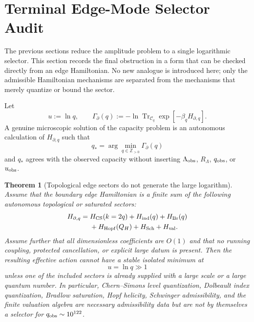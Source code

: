 \documentclass[aps,prd,reprint,nofootinbib,superscriptaddress,floatfix]{revtex4-2}
\numberwithin{equation}{section}
\theoremstyle{definition}
\theoremstyle{plain}
\newtheorem{theorem}{Theorem}[section]
\begin{document}
\section{Terminal Edge-Mode Selector Audit}\label{sec:terminal-edge-selector-audit}

The previous sections reduce the amplitude problem to a single logarithmic
selector.  This section records the final obstruction in a form that can be
checked directly from an edge Hamiltonian.  No new analogue is introduced here;
only the admissible Hamiltonian mechanisms are separated from the mechanisms
that merely quantize or bound the sector.

Let
\begin{equation}
u:=\ln q,
\qquad
\Gamma_\partial(q):=
-\ln\operatorname{Tr}_{\mathcal C_q}
\exp[-\beta_qH_{\partial,q}].
\end{equation}
A genuine microscopic solution of the capacity problem is an autonomous
calculation of \(H_{\partial,q}\) such that
\begin{equation}
q_*=\arg\min_{q\in\mathbb Z_{>0}}\Gamma_\partial(q)
\end{equation}
and \(q_*\) agrees with the observed capacity without inserting
\(\Lambda_{\rm obs}\), \(R_\Lambda\), \(q_{\rm obs}\), or \(u_{\rm obs}\).

\begin{theorem}[Topological edge sectors do not generate the large logarithm]\label{thm:topological-edge-no-large-u}
Assume that the boundary edge Hamiltonian is a finite sum of the following
autonomous topological or saturated sectors:
\begin{align}
H_{\partial,q}
={}&H_{\rm CS}(k=2q)+H_{\rm ind}(q)+H_{\rm Br}(q)\nonumber\\
&+H_{\rm Hopf}(Q_H)+H_{\rm Sch}+H_{\rm val}.
\end{align}
Assume further that all dimensionless coefficients are \(O(1)\) and that no
running coupling, protected cancellation, or explicit large datum is present.
Then the resulting effective action cannot have a stable isolated minimum at
\[
u=\ln q\gg1
\]
unless one of the included sectors is already supplied with a large scale or a
large quantum number.  In particular, Chern--Simons level quantization,
Dolbeault index quantization, Bradlow saturation, Hopf helicity, Schwinger
admissibility, and the finite valuation algebra are necessary admissibility
data but are not by themselves a selector for \(q_{\rm obs}\sim10^{122}\).
\end{theorem}
\end{document}
